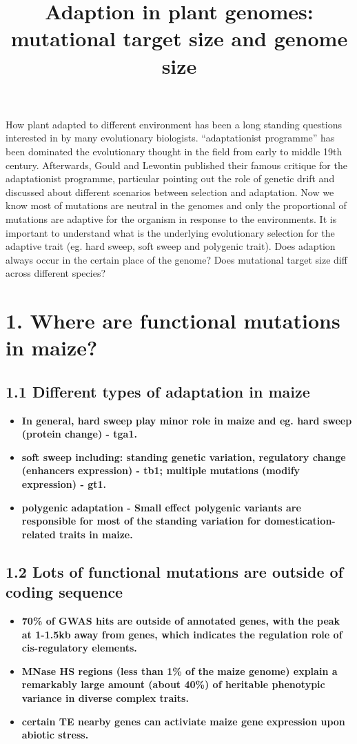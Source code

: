 \documentclass[12pt]{article}
\title{Adaption in plant genomes: mutational target size and genome size}
\begin{document}
\maketitle
How plant adapted to different environment has been a long standing questions interested in by many evolutionary biologists. ``adaptationist programme'' has been dominated the evolutionary thought in the field from early to middle 19th century. Afterwards, Gould and Lewontin published their famous critique for the adaptationist programme, particular pointing out the role of genetic drift and discussed about different  scenarios between selection and adaptation. Now we know most of mutations are neutral in the genomes and only the proportional of mutations are adaptive for the organism in response to the environments. It is important to understand what is the underlying evolutionary selection for the adaptive trait (eg. hard sweep, soft sweep and polygenic trait). Does adaption always occur in the certain place of the genome? Does mutational target size diff across different species?

\section*{1. Where are functional mutations in maize?}
\subsection*{1.1 Different types of adaptation in maize}
\begin{itemize}
\item \textbf{In general, hard sweep play minor role in maize and eg. hard sweep (protein change) - tga1.}

\item \textbf{soft sweep including: standing genetic variation, regulatory change (enhancers expression) - tb1; multiple mutations (modify expression) - gt1.}

\item \textbf{polygenic adaptation - Small effect polygenic variants are responsible for most of the standing variation for domestication-related traits in maize.}
\end{itemize}

\subsection*{1.2 Lots of functional mutations are outside of coding sequence}
\begin{itemize}
\item \textbf{70\% of GWAS hits are outside of annotated genes, with the peak at 1-1.5kb away from genes, which indicates the regulation role of cis-regulatory elements.}

\item \textbf{MNase HS regions (less than 1\% of the maize genome) explain a remarkably large amount (about 40\%) of heritable phenotypic variance in diverse complex traits.}

\item \textbf{certain TE nearby genes can activiate maize gene expression upon abiotic stress.}
\end{itemize}
\end{document}
